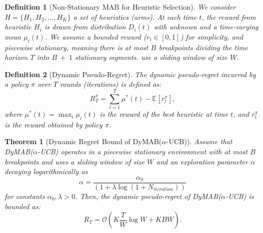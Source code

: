 \documentclass[review]{jair}
\newtheorem{theorem}{Theorem}
\newtheorem{definition}{Definition}
\begin{document}
\begin{definition}[Non-Stationary MAB for Heuristic Selection]
We consider $H = \{ H_1, H_2, \ldots, H_K \}$ a set of heuristics (arms). At each time $t$, the reward from heuristic $H_i$ is drawn from distribution $D_i(t)$ with unknown and a time-varying mean $\mu_i(t)$.
We assume a bounded reward ($r_t \in [0, 1]$) for simplicity, and piecewise stationary, meaning there is at most $B$ breakpoints dividing the time horizon $T$ into $B \ + \ 1$ stationary segments.  use a sliding window of size $W$. 
\end{definition}

\begin{definition}[Dynamic Pseudo-Regret]
The dynamic pseudo-regret incurred by a policy $\pi$ over $T$ rounds (iterations) is defined as:
\begin{equation}
R_T^\pi = \sum_{t=1}^{T} \mu^*(t) - \mathbb{E}[r_t^\pi],
\end{equation}
where $\mu^*(t) = \max_i \mu_i(t)$ is the reward of the best heuristic at time $t$, and $r_t^\pi$ is the reward obtained by policy $\pi$.
\end{definition}

\begin{theorem}[Dynamic Regret Bound of DyMAB($\alpha$-UCB)]\label{thm:dymab_ucb}
Assume that DyMAB($\alpha$-UCB) operates in a piecewise stationary environment with at most $B$ breakpoints and uses a sliding window of size $W$ and an exploration parameter $\alpha$ decaying logarithmically as 
\begin{equation}
    \alpha = \frac{\alpha_0}{(1+ \lambda \log(1 + N_{iteration}))}
\end{equation}
for constants $\alpha_0, \lambda > 0$. Then, the dynamic pseudo-regret of DyMAB($\alpha$-UCB) is bounded as:
\begin{equation}
R_T = \mathcal{O}\left(K \frac{T}{W} \log W + KBW\right).
\end{equation}
\end{theorem}
\end{document}
